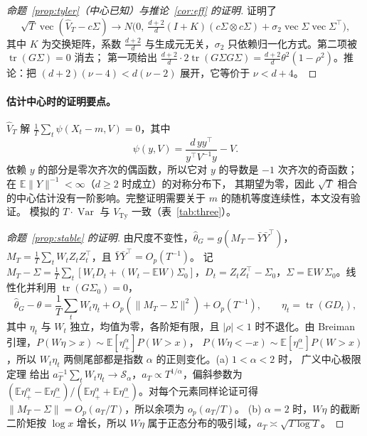 \documentclass[11pt,UTF8]{ctexart}
\newcommand{\E}{\mathbb{E}}
\newcommand{\Var}{\operatorname{Var}}
\newcommand{\tr}{\operatorname{tr}}
\newcommand{\vecop}{\operatorname{vec}}
\begin{document}
\begin{proof}[命题~\ref{prop:tyler}（中心已知）与推论~\ref{cor:eff} 的证明]
\citet{tyler1987} 证明了
\[
\sqrt T\vecop(\hat V_T-c\Sigma)\to N\Big(0,\ \tfrac{d+2}d(I+K)(c\Sigma\otimes c\Sigma)+\sigma_2\vecop\Sigma\vecop\Sigma^\top\Big),
\]
其中 $K$ 为交换矩阵，系数 $\frac{d+2}d$ 与生成元无关，$\sigma_2$ 只依赖归一化方式。第二项被 $\tr(G\Sigma)=0$ 消去；
第一项给出 $\frac{d+2}d\cdot2\tr(G\Sigma G\Sigma)=\frac{d+2}d\theta^2(1-\rho^2)$。推论：把 $(d+2)(\nu-4)<d(\nu-2)$ 展开，它等价于 $\nu<d+4$。
\end{proof}

\paragraph{估计中心时的证明要点。}
$\hat V_T$ 解 $\frac1T\sum_t\psi(X_t-m,V)=0$，其中
\[
\psi(y,V)=\frac{d\,yy^\top}{y^\top V^{-1}y}-V .
\]
依赖 $y$ 的部分是零次齐次的偶函数，所以它对 $y$ 的导数是 $-1$ 次齐次的奇函数；在 $\E\|Y\|^{-1}<\infty$（$d\ge2$ 时成立）的对称分布下，
其期望为零，因此 $\sqrt T$ 相合的中心估计没有一阶影响。完整证明需要关于 $m$ 的随机等度连续性，本文没有验证。
模拟的 $T\cdot\Var$ 与 $V_{\mathrm{Ty}}$ 一致（表~\ref{tab:three}）。

\begin{proof}[命题~\ref{prop:stable} 的证明]
由尺度不变性，$\hat\theta_G=g(M_T-\bar Y\bar Y^\top)$，$M_T=\frac1T\sum_tW_tZ_tZ_t^\top$，且 $\bar Y\bar Y^\top=O_p(T^{-1})$。
记 $M_T-\Sigma=\frac1T\sum_t[W_tD_t+(W_t-\E W)\Sigma_0]$，$D_t=Z_tZ_t^\top-\Sigma_0$，$\Sigma=\E W\,\Sigma_0$。线性化并利用 $\tr(G\Sigma_0)=0$，
\[
\hat\theta_G-\theta=\frac1T\sum_tW_t\eta_t+O_p(\|M_T-\Sigma\|^2)+O_p(T^{-1}),\qquad\eta_t=\tr(GD_t),
\]
其中 $\eta_t$ 与 $W_t$ 独立，均值为零，各阶矩有限，且 $|\rho|<1$ 时不退化。由 Breiman 引理，$P(W\eta>x)\sim\E[\eta_+^\alpha]P(W>x)$，
$P(W\eta<-x)\sim\E[\eta_-^\alpha]P(W>x)$，所以 $W_t\eta_t$ 两侧尾部都是指数 $\alpha$ 的正则变化。(a) $1<\alpha<2$ 时，
广义中心极限定理 \citep[第~XVII~章]{feller1971} 给出 $a_T^{-1}\sum_tW_t\eta_t\to\mathcal S_\alpha$，$a_T\propto T^{1/\alpha}$，偏斜参数为
$(\E\eta_+^\alpha-\E\eta_-^\alpha)/(\E\eta_+^\alpha+\E\eta_-^\alpha)$。对每个元素同样论证可得 $\|M_T-\Sigma\|=O_p(a_T/T)$，所以余项为 $o_p(a_T/T)$。
(b) $\alpha=2$ 时，$W\eta$ 的截断二阶矩按 $\log x$ 增长，所以 $W\eta$ 属于正态分布的吸引域，$a_T\asymp\sqrt{T\log T}$。
\end{proof}
\end{document}
